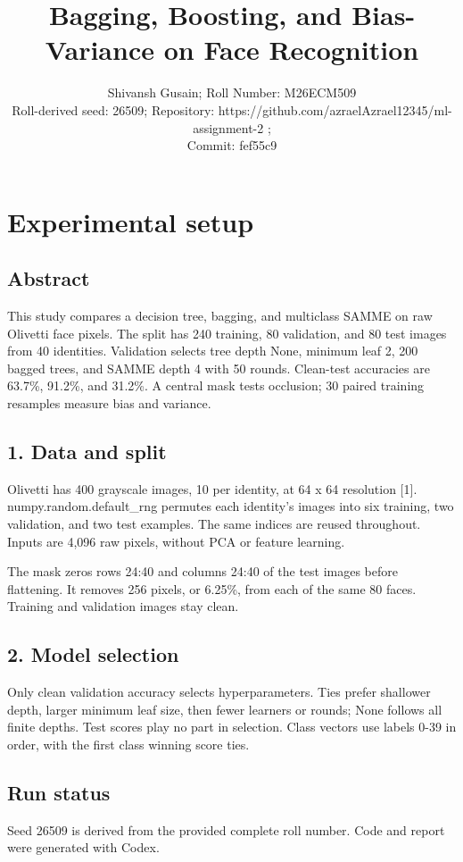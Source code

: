 \documentclass[10pt,twocolumn,letterpaper]{article}
\title{Bagging, Boosting, and Bias-Variance on Face Recognition}
\author{Shivansh Gusain; Roll Number: M26ECM509\\Roll-derived seed: 26509; Repository: https://github.com/azraelAzrael12345/ml-assignment-2 ; \\ Commit: fef55c9}
\begin{document}
\maketitle
\section*{Experimental setup}
\subsection*{Abstract}
This study compares a decision tree, bagging, and multiclass SAMME on raw Olivetti face pixels. The split has 240 training, 80 validation, and 80 test images from 40 identities. Validation selects tree depth None, minimum leaf 2, 200 bagged trees, and SAMME depth 4 with 50 rounds. Clean-test accuracies are 63.7\%, 91.2\%, and 31.2\%. A central mask tests occlusion; 30 paired training resamples measure bias and variance.

\subsection*{1. Data and split}
Olivetti has 400 grayscale images, 10 per identity, at 64 x 64 resolution [1]. numpy.random.default\_rng permutes each identity's images into six training, two validation, and two test examples. The same indices are reused throughout. Inputs are 4,096 raw pixels, without PCA or feature learning.

The mask zeros rows 24:40 and columns 24:40 of the test images before flattening. It removes 256 pixels, or 6.25\%, from each of the same 80 faces. Training and validation images stay clean.

\subsection*{2. Model selection}
Only clean validation accuracy selects hyperparameters. Ties prefer shallower depth, larger minimum leaf size, then fewer learners or rounds; None follows all finite depths. Test scores play no part in selection. Class vectors use labels 0-39 in order, with the first class winning score ties.

\newpage
\subsection*{Run status}
Seed 26509 is derived from the provided complete roll number. Code and report were generated with Codex.
\end{document}
